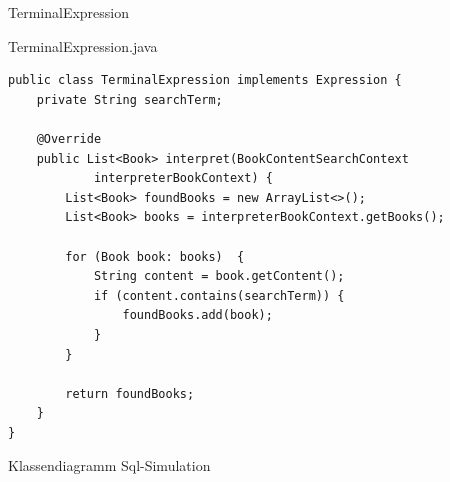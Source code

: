 \begin{frame}[fragile]{TerminalExpression}
	\begin{exampleblock}{TerminalExpression.java}
 		\begin{lstlisting}
public class TerminalExpression implements Expression {
	private String searchTerm;

	@Override
	public List<Book> interpret(BookContentSearchContext 
            interpreterBookContext) {
		List<Book> foundBooks = new ArrayList<>();
		List<Book> books = interpreterBookContext.getBooks();
		
		for (Book book: books)  {
			String content = book.getContent();
			if (content.contains(searchTerm)) {
				foundBooks.add(book);
			}
		}
		
		return foundBooks;
	}
}
 		\end{lstlisting}
 	\end{exampleblock}
\end{frame}


\begin{frame}{Klassendiagramm Sql-Simulation}
\end{frame}

